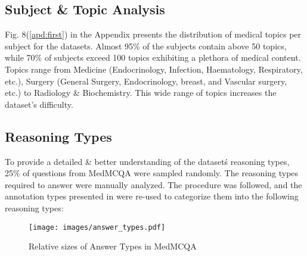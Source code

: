 \documentclass[pmlr,twocolumn,10pt]{jmlr}
\begin{document}
\subsection{Subject \& Topic Analysis}
Fig. 8(\ref{apd:first}) in the Appendix presents the distribution of medical topics per subject for the datasets. Almost 95\% of the subjects contain above 50 topics, while 70\% of subjects exceed 100 topics exhibiting a plethora of medical content. Topics range from Medicine (Endocrinology, Infection, Haematology, Respiratory, etc.), Surgery (General Surgery, Endocrinology, breast, and Vascular surgery, etc.) to Radiology \& Biochemistry. This wide range of topics increases the dataset's difficulty.

\subsection{Reasoning Types}
\label{apd:re_type}
To provide a detailed \& better understanding of the dataset\'s reasoning types,  25\% of questions from MedMCQA were sampled randomly. The reasoning types required to answer were manually analyzed. The procedure was followed, and the annotation types presented in \citep{Clark2018} were re-used to categorize them into the following reasoning types:

\begin{figure}
  \texttt{[image: images/answer\_types.pdf]}
  \caption{ \footnotesize Relative sizes of Answer Types in MedMCQA}
  \label{fig:answer_types}
\end{figure}
\end{document}
